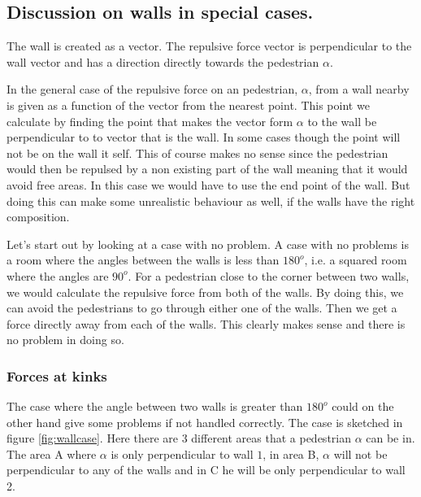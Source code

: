 \subsection{Discussion on walls in special cases.}\label{wallEndpoints}
The wall is created as a vector. The repulsive force vector is perpendicular to the wall 
vector and has a direction directly towards the pedestrian $\alpha$.

In the general case of the repulsive force on an pedestrian, $\alpha$, from a wall 
nearby is given as a function of the vector from the nearest point. This point we 
calculate by finding the point that makes the vector form $\alpha$ to the wall be 
perpendicular to to vector that is the wall. In some cases though the point will not 
be on the wall it self. This of course makes no sense since the pedestrian would then be 
repulsed by a non existing part of the wall meaning that it would avoid free 
areas. In this case we would have to use the end point of the wall. But doing this 
can make some unrealistic behaviour as well, if the walls have the right composition. 

Let's start out by looking at a case with no problem. A case with no problems is a 
room where the angles between the walls is less than $180^o$, i.e. a squared room 
where the angles are $90^o$. For a pedestrian close to the corner between two walls, we 
would calculate the repulsive force from both of the walls. By doing this, we can avoid 
the pedestrians to go through either one of the walls. Then we get a force directly away 
from each of the walls. This clearly makes sense and there is no problem in doing so.

\subsubsection{Forces at kinks}
The case where the angle between two walls is greater than $180^o$ could on the 
other hand give some problems if not handled correctly. The case is sketched in 
figure \ref{fig:wallcase}. Here there are 3 different areas that a pedestrian $\alpha$ 
can be in. The area A where $\alpha$ is only perpendicular to wall $1$, in area B, 
$\alpha$ will not be perpendicular to any of the walls and in C he will be only 
perpendicular to wall 2. 

